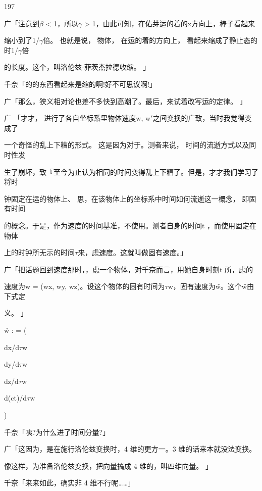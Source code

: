 197\par
广「注意到$\beta$ < 1，所以$\gamma$ > 1，由此可知，在佑芽运的着的x方向上，棒子看起来\par
缩小到了1/$\gamma$倍。 也就是说， 物体， 在运的着的方向上， 看起来缩成了静止态的时1/$\gamma$倍\par
的长度。这个，叫洛伦兹-菲茨杰拉德收缩。 」\par
千奈「的的东西看起来是缩的啊!好不可思议啊!」\par
广「那么，狭义相对论也差不多快到高潮了。最后，来试着改写运的定律。 」\par
广 「才才， 进行了各自坐标系里物体速度w, w$\prime$之间变换的广致，当时我觉得变成了\par
一个奇怪的乱上下糟的形式。 这是因为对于。测者来说， 时间的流逝方式以及同时性发\par
生了崩坏，致『至今为止认为相同的时间变得乱上下糟了。但是，才才我们学习了将时\par
钟固定在运的物体上、 思，在该物体上的坐标系中时间如何流逝这一概念， 即固有时间\par
的概念。于是，作为速度的时间基准，不使用。测者自身的时间t ，而使用固定在物体\par
上的时钟所无示的时间$\tau$来，虑速度。这就叫做固有速度。」\par
广「把话题回到速度那时，，虑一个物体，对千奈而言，用她自身时刻t 所，虑的\par
速度为w = (wx, wy, wz)。设这个物体的固有时间为$\tau$w，固有速度为w̌。这个w̌由下式定\par
义。 」\par
w̌ : = (\par
dx/d$\tau$w\par
dy/d$\tau$w\par
dz/d$\tau$w\par
d(ct)/d$\tau$w\par
)\par
千奈「咦?为什么进了时间分量?」\par
广「这因为，是在施行洛伦兹变换时，4 维的更方一。3 维的话来本就没法变换。\par
像这样，为准备洛伦兹变换，把向量搞成 4 维的，叫四维向量。 」\par
千奈「来来如此，确实非 4 维不行呢……」\par

